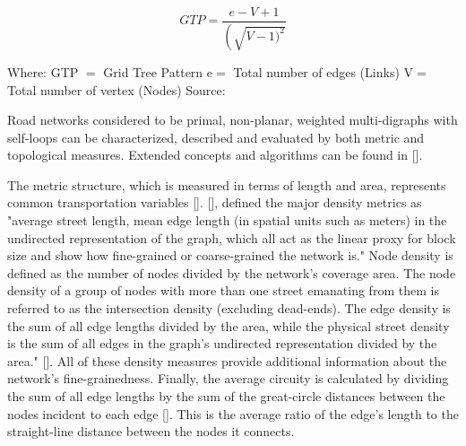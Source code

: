 \begin{equation}
{GTP}=\frac{e-V+1}{\left(\sqrt{V-1)^{2}}\right.}
\end{equation}

Where:
GTP $=$ Grid Tree Pattern
$\mathrm{e}=$ Total number of edges (Links)
$\mathrm{V}=$ Total number of vertex (Nodes)
{Source: \cite{Tini:2018}}

Road networks considered to be primal, non-planar, weighted multi-digraphs with self-loops can be characterized, described and evaluated by both metric and topological measures. Extended concepts and algorithms can be found in [\cite{Newman:2010, Barthelemy:2011}]. 

The metric structure, which is measured in terms of length and area, represents common transportation variables [\cite{Cervero:1997, Ewing:2010}]. [\cite{Boeing:2017}], defined the major density metrics as "average street length, mean edge length (in spatial units such as meters) in the undirected representation of the graph, which all act as the linear proxy for block size and show how fine-grained or coarse-grained the network is." Node density is defined as the number of nodes divided by the network's coverage area. The node density of a group of nodes with more than one street emanating from them is referred to as the intersection density (excluding dead-ends). The edge density is the sum of all edge lengths divided by the area, while the physical street density is the sum of all edges in the graph's undirected representation divided by the area." [\cite{Boeing:2017}]. All of these density measures provide additional information about the network's fine-grainedness. Finally, the average circuity is calculated by dividing the sum of all edge lengths by the sum of the great-circle distances between the nodes incident to each edge [\cite{Giacomin:2015}]. This is the average ratio of the edge's length to the straight-line distance between the nodes it connects.


